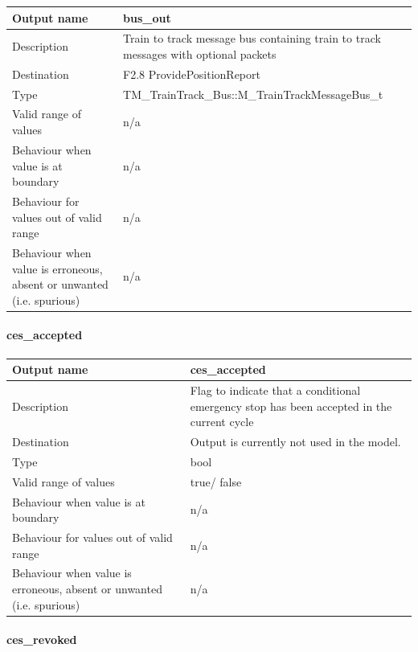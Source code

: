 \begin{longtable}{p{}p{}}
\toprule
Output name				& bus\_out \\
\midrule
Description				& Train to track message bus containing train to track messages with optional packets \\
\midrule
Destination				& F2.8 ProvidePositionReport  \\ 
\midrule
Type					& TM\_TrainTrack\_Bus::M\_TrainTrackMessageBus\_t\\
\midrule
Valid range of values	& n/a \\
\midrule
Behaviour when value is at boundary	& n/a  \\
\midrule
Behaviour for values out of valid range	& n/a  \\
\midrule
Behaviour when value is erroneous, absent or unwanted (i.e. spurious) & n/a  \\
\bottomrule
\end{longtable}

\paragraph{ces\_accepted}

\begin{longtable}{p{}p{}}
\toprule
Output name				& ces\_accepted \\
\midrule
Description				& Flag to indicate that a conditional emergency stop has been accepted in the current cycle \\
\midrule
Destination				& Output is currently not used in the model.  \\ 
\midrule
Type					& bool\\
\midrule
Valid range of values	& true/ false \\
\midrule
Behaviour when value is at boundary	& n/a  \\
\midrule
Behaviour for values out of valid range	& n/a  \\
\midrule
Behaviour when value is erroneous, absent or unwanted (i.e. spurious) & n/a  \\
\bottomrule
\end{longtable}

\paragraph{ces\_revoked}

